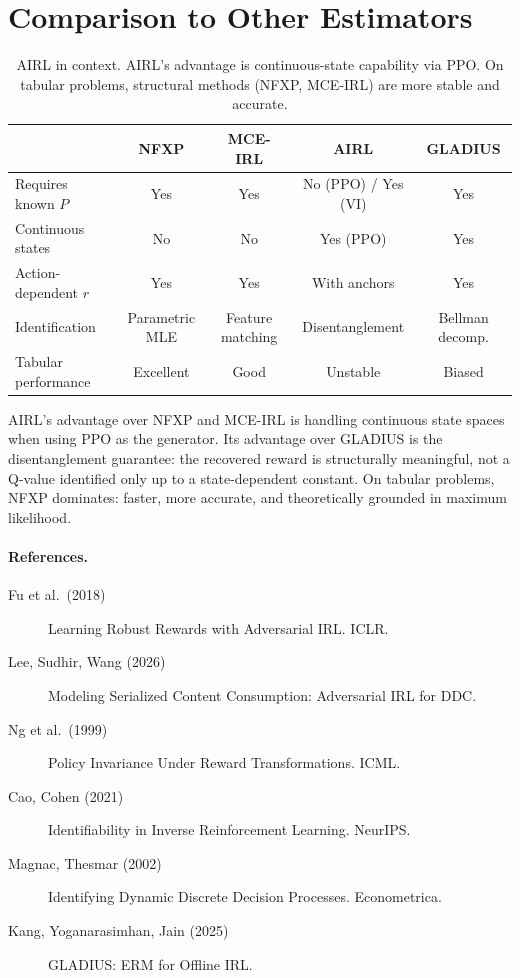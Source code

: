 \documentclass[11pt]{article}
\begin{document}
\section{Comparison to Other Estimators}

\begin{table}[h!]
\centering\small
\begin{tabular}{lcccc}
\toprule
 & NFXP & MCE-IRL & AIRL & GLADIUS \\
\midrule
Requires known $P$ & Yes & Yes & No (PPO) / Yes (VI) & Yes \\
Continuous states & No & No & Yes (PPO) & Yes \\
Action-dependent $r$ & Yes & Yes & With anchors & Yes \\
Identification & Parametric MLE & Feature matching & Disentanglement & Bellman decomp. \\
Tabular performance & Excellent & Good & Unstable & Biased \\
\bottomrule
\end{tabular}
\caption{AIRL in context. AIRL's advantage is continuous-state capability via PPO. On tabular problems, structural methods (NFXP, MCE-IRL) are more stable and accurate.}
\label{tab:comparison}
\end{table}
\FloatBarrier

AIRL's advantage over NFXP and MCE-IRL is handling continuous state spaces when using PPO as the generator. Its advantage over GLADIUS is the disentanglement guarantee: the recovered reward is structurally meaningful, not a Q-value identified only up to a state-dependent constant. On tabular problems, NFXP dominates: faster, more accurate, and theoretically grounded in maximum likelihood.

\paragraph{References.}
\begin{description}
\item[Fu et al.\ (2018)] Learning Robust Rewards with Adversarial IRL. ICLR.
\item[Lee, Sudhir, Wang (2026)] Modeling Serialized Content Consumption: Adversarial IRL for DDC.
\item[Ng et al.\ (1999)] Policy Invariance Under Reward Transformations. ICML.
\item[Cao, Cohen (2021)] Identifiability in Inverse Reinforcement Learning. NeurIPS.
\item[Magnac, Thesmar (2002)] Identifying Dynamic Discrete Decision Processes. Econometrica.
\item[Kang, Yoganarasimhan, Jain (2025)] GLADIUS: ERM for Offline IRL.
\end{description}
\end{document}

